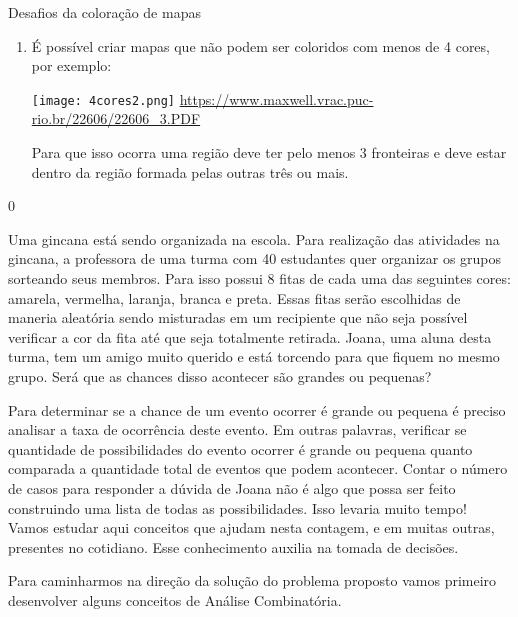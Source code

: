 \begin{answer}{Desafios da coloração de mapas}
{\begin{enumerate}[wide]
\item É possível criar mapas que não podem ser coloridos com menos de 4 cores, por exemplo: 
\begin{center} 

\texttt{[image: 4cores2.png]}
\url{https://www.maxwell.vrac.puc-rio.br/22606/22606_3.PDF}
\end{center}

Para que isso ocorra uma região deve ter pelo menos 3 fronteiras e deve estar dentro da região formada pelas outras três ou mais.

\end{enumerate}
}{0}
\end{answer}


Uma gincana está sendo organizada na escola. Para realização das atividades na gincana, a professora de uma turma com 40 estudantes quer organizar os grupos sorteando seus membros. Para isso possui 8 fitas de cada uma das seguintes cores: amarela, vermelha, laranja, branca e preta. Essas fitas serão escolhidas de maneria aleatória sendo misturadas em um recipiente que não seja possível verificar a cor da fita até que seja totalmente retirada.  Joana, uma aluna desta turma, tem um amigo muito querido e está torcendo para que fiquem no mesmo grupo. Será que as chances disso acontecer são grandes ou pequenas?


Para determinar se a chance de um evento ocorrer é grande ou pequena é preciso analisar a taxa de ocorrência deste evento. Em outras palavras, verificar se quantidade de possibilidades do evento ocorrer é grande ou pequena quanto comparada a quantidade total de eventos que podem acontecer. 
Contar o número de casos para responder a dúvida de Joana não é algo que possa ser feito construindo uma lista de todas as possibilidades. Isso levaria muito tempo! Vamos estudar aqui conceitos que ajudam nesta contagem, e em muitas outras, presentes no cotidiano. Esse conhecimento auxilia na tomada de decisões.  

Para caminharmos na direção da solução do problema proposto vamos primeiro desenvolver alguns conceitos de Análise Combinatória. 

